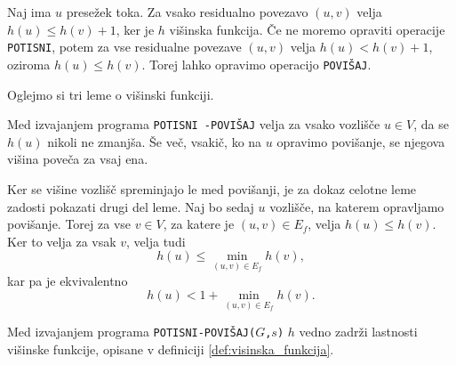 \documentclass[mat1]{fmfdelo}
\begin{document}
\begin{dokaz}
Naj ima $u$ presežek toka. Za vsako residualno povezavo $(u,v)$ velja $h(u) \leq h(v) + 1$, ker je $h$ višinska funkcija. Če ne moremo opraviti operacije \texttt{POTISNI}, potem za vse residualne povezave $(u,v)$ velja $h(u) < h(v)+1$, oziroma $h(u) \leq h(v)$. Torej lahko opravimo operacijo \texttt{POVIŠAJ}.
\end{dokaz}

Oglejmo si tri leme o višinski funkciji.

\begin{lema}\label{lem:visina_ne_pada}
Med izvajanjem programa \texttt{POTISNI -POVIŠAJ} velja za vsako vozlišče $u \in V$, da se $h(u)$ nikoli ne zmanjša. Še več, vsakič, ko na $u$ opravimo povišanje, se njegova višina poveča za vsaj ena.
\end{lema}

\begin{dokaz}
Ker se višine vozlišč spreminjajo le med povišanji, je za dokaz celotne leme zadosti pokazati drugi del leme. Naj bo sedaj $u$ vozlišče, na katerem opravljamo povišanje. Torej za vse $v \in V$, za katere je $(u,v) \in E_f$, velja $h(u) \leq h(v)$. Ker to velja za vsak $v$, velja tudi \[h(u) \leq \min_{(u,v) \in E_f} h(v),\] kar pa je ekvivalentno \[h(u) < 1 + \min_{(u,v) \in E_f} h(v).\]
\end{dokaz}

\begin{lema}\label{lem:h_ostane_visinska}
Med izvajanjem programa \texttt{POTISNI-POVIŠAJ($G$,$s$)} $h$ vedno zadrži la\-stnosti višinske funkcije, opisane v definiciji \ref{def:visinska_funkcija}.
\end{lema}
\end{document}
